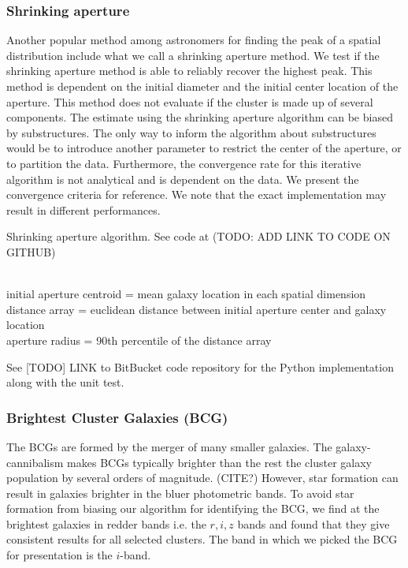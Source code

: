 \subsubsection{Shrinking aperture}
Another popular method among astronomers for finding the peak of a spatial
distribution include what we call a shrinking aperture method.
We test if the shrinking aperture method is able to reliably recover the highest 
peak.
This method is dependent on the initial diameter and the initial center 
location of the aperture.
This method does not evaluate if the cluster is made up of
several components.
The estimate using the shrinking aperture algorithm can be biased by
substructures. The only way to inform the algorithm about substructures would
be to introduce another parameter to restrict the center of the aperture, or to
partition the data.
Furthermore, the convergence rate for this iterative algorithm is not
analytical and is dependent on the data. We present the
convergence criteria for reference. 
We note that the exact implementation may result in different performances.
\begin{algorithm}
	\caption{Shrinking aperture algorithm. See code at (TODO: ADD LINK TO CODE ON
	GITHUB)}
	 \hrulefill \\

	 initial aperture centroid = mean galaxy location in each spatial dimension\\
 	distance array = euclidean distance between initial aperture center and galaxy
	location \\
 	aperture radius = 90th percentile of the distance array\\ 
	   \hrulefill
 \end{algorithm}
 See [TODO] LINK to BitBucket code repository for the Python implementation
 along with the unit test.


\subsubsection{Brightest Cluster Galaxies (BCG)}
The BCGs are formed by the merger of many smaller
galaxies. The galaxy-cannibalism makes BCGs typically brighter than the rest the 
cluster galaxy population by several orders of magnitude. (CITE?)
However, star formation can result
in galaxies brighter in the bluer photometric bands.
To avoid star formation from biasing our algorithm for identifying the
BCG, we find at the brightest galaxies in redder bands i.e. the $r, i, z$
bands and found that they give consistent results for all selected clusters. 
The band in which we picked the BCG for presentation is the $i$-band. 

